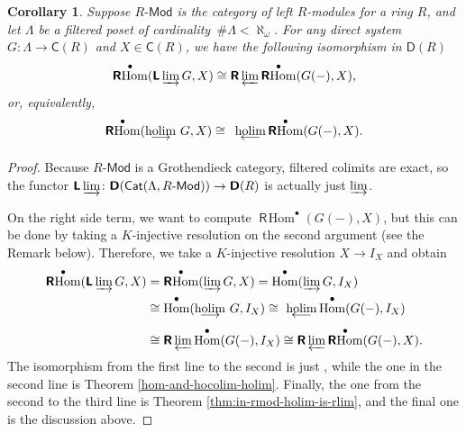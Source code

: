\documentclass[reqno,11pt]{amsart}
\theoremstyle{plain}
\newtheorem{cor}[thm]{Corollary}
\theoremstyle{remark}
\theoremstyle{definition}
\numberwithin{equation}{thm}
\newcommand{\CCC}{\boldsymbol{\mathsf{C}}}
\newcommand{\D}{\boldsymbol{\mathsf{D}}}
\newcommand{\LL}{\boldsymbol{\mathsf{L}}}
\newcommand{\R}{\boldsymbol{\mathsf{R}}}
\newcommand{\holim}[1]{\begin{array}[t]{c} {\rm holim}\\[-7.5 pt]
		{\longleftarrow} \end{array}}
\newcommand{\hocolim}[1]{\begin{array}[t]{c} {\rm holim}\\[-7.5 pt]
		{\longrightarrow} \end{array}}
\DeclareMathOperator{\Hom}{Hom}
\DeclareMathOperator{\rhom}{\R\!\Hom}
\newcommand{\md}{\text{-}\mathsf{Mod}}
\DeclareMathOperator{\cat}{\mathsf{Cat}}
\begin{document}
	\begin{cor}\label{cor:derived-limits-and-colimits}
		Suppose $R\md$ is the category of left $R$-modules for a ring $R$, and let $\Lambda$ be a filtered poset of cardinality \,$\#\Lambda < \aleph_\omega$. For any direct system $G \colon \Lambda \to \CCC(R)$ and $X \in \CCC(R)$, we have the following isomorphism in $\D(R)$
		\[
			\rhom^\bullet(\LL\varinjlim G, X) \cong \R\varprojlim \rhom^\bullet(G(-),X),
		\]
		or, equivalently,
		\[
		\rhom^\bullet(\!\!\!\hocolim{}\!G, X) \cong \holim{} \!\!\!\rhom^\bullet(G(-),X).
		\]
	\end{cor}
	\begin{proof}
		Because $R\md$ is a Grothendieck category, filtered colimits are exact, so the functor $\LL\varinjlim \colon \D(\cat(\Lambda, R\md)) \to \D(R)$ is actually just $\varinjlim$.
		
		On the right side term, we want to compute $\rhom^\bullet(G(-),X)$, but this can be done by taking a $K$-injective resolution on the second argument (see the Remark below). Therefore, we take a $K$-injective resolution $X \to I_X$ and obtain 
		\begin{equation*}
			\begin{aligned}
				\rhom^\bullet(\LL\varinjlim G, X) &= \rhom^\bullet(\varinjlim G, X) = \Hom^\bullet(\varinjlim G, I_X) \\
				&\cong \Hom^\bullet(\!\!\!\hocolim{}\!G, I_X) 
				\cong \!\holim{} \!\!\!\Hom^\bullet(G(-), I_X) \\
				&\cong \R\varprojlim \Hom^\bullet(G(-), I_X) \cong \R\varprojlim \rhom^\bullet(G(-),X).
			\end{aligned}
		\end{equation*}
		The isomorphism from the first line to the second is just \cite[Theorem 2.2.]{AJS}, while the one in the second line is Theorem \ref{hom-and-hocolim-holim}. Finally, the one from the second to the third line is Theorem \ref{thm:in-rmod-holim-is-rlim}, and the final one is the discussion above.
	\end{proof}
\end{document}
